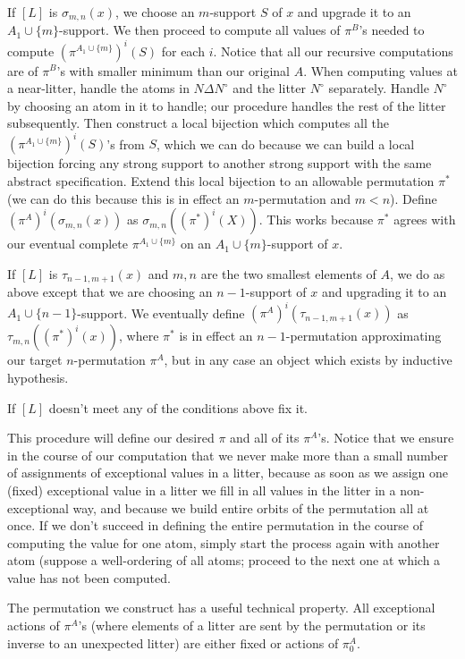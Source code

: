 \documentclass[12pt]{article}
\begin{document}
\begin{enumerate}
If $[L]$ is $\sigma_{m,n}(x)$, we choose an $m$-support $S$ of $x$ and upgrade it to an $A_1 \cup \{m\}$-support.  We then proceed to compute all values of $\pi^B$'s needed to compute
$(\pi^{A_1 \cup \{m\}})^i(S)$ for each $i$.  Notice that all our recursive computations are of $\pi^B$'s with smaller minimum than our original $A$.  When computing values at a near-litter, handle
the atoms in $N \Delta N^{\circ}$ and the litter $N^{\circ}$ separately.  Handle $N^{\circ}$ by choosing an atom in it to handle;  our procedure handles the rest of the litter subsequently.  Then construct
a local bijection which computes all the $(\pi^{A_1 \cup \{m\}})^i(S)$'s from $S$, which we can do because we can build a local bijection forcing any strong
support to another strong support with the same abstract specification.  Extend this local bijection to an allowable permutation $\pi^*$ (we can do this because this is in effect an $m$-permutation
and $m<n$).  Define $(\pi^A)^i(\sigma_{m,n}(x))$ as $\sigma_{m,n}((\pi^*)^i(X))$.  This works because $\pi^*$ agrees with our eventual complete $\pi^{A_1 \cup \{m\}}$ on an $A_1 \cup \{m\}$-support of $x$.

If $[L]$ is $\tau_{n-1,m+1}(x)$ and $m,n$ are the two smallest elements of $A$, we do as above except that we are choosing an $n-1$-support of $x$ and upgrading it to an $A_1 \cup \{n-1\}$-support.
We eventually define $(\pi^A)^i(\tau_{n-1,m+1}(x))$ as $\tau_{m,n}((\pi^*)^i(x))$, where $\pi^*$ is in effect an $n-1$-permutation approximating our target $n$-permutation $\pi^A$, but in any case an object which exists by inductive hypothesis.

If $[L]$ doesn't meet any of the conditions above fix it.

This procedure  will define our desired $\pi$ and all of its $\pi^A$'s.  Notice that we ensure in the course of our computation that we never make more than a small number of assignments of
exceptional values in a litter, because as soon as we assign one (fixed) exceptional value in a litter we fill in all values in the litter in a non-exceptional way, and because we build entire orbits of the permutation all at once.  If we don't succeed in defining the entire permutation in the course of computing the value for one atom, simply start the process again with another atom (suppose a well-ordering of all atoms; proceed to the next one at which a value has not been computed.

The permutation we construct has a useful technical property.  All exceptional actions of $\pi^A$'s (where elements of a litter  are sent by the permutation or its inverse to an unexpected litter) are either fixed
or actions of $\pi^A_0$.












\end{enumerate}
\end{document}
